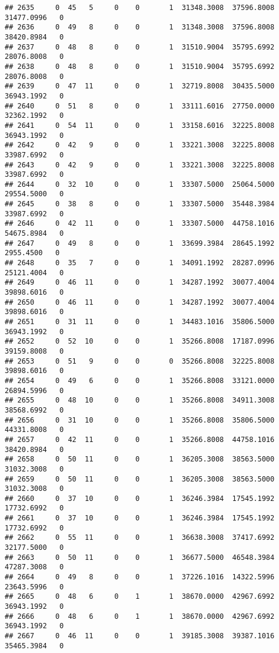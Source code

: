 \documentclass[
]{article}
\begin{document}
\begin{enumerate}
\begin{verbatim}
## 2635     0  45   5     0    0       1  31348.3008  37596.8008  31477.0996   0
## 2636     0  49   8     0    0       1  31348.3008  37596.8008  38420.8984   0
## 2637     0  48   8     0    0       1  31510.9004  35795.6992  28076.8008   0
## 2638     0  48   8     0    0       1  31510.9004  35795.6992  28076.8008   0
## 2639     0  47  11     0    0       1  32719.8008  30435.5000  36943.1992   0
## 2640     0  51   8     0    0       1  33111.6016  27750.0000  32362.1992   0
## 2641     0  54  11     0    0       1  33158.6016  32225.8008  36943.1992   0
## 2642     0  42   9     0    0       1  33221.3008  32225.8008  33987.6992   0
## 2643     0  42   9     0    0       1  33221.3008  32225.8008  33987.6992   0
## 2644     0  32  10     0    0       1  33307.5000  25064.5000  29554.5000   0
## 2645     0  38   8     0    0       1  33307.5000  35448.3984  33987.6992   0
## 2646     0  42  11     0    0       1  33307.5000  44758.1016  54675.8984   0
## 2647     0  49   8     0    0       1  33699.3984  28645.1992   2955.4500   0
## 2648     0  35   7     0    0       1  34091.1992  28287.0996  25121.4004   0
## 2649     0  46  11     0    0       1  34287.1992  30077.4004  39898.6016   0
## 2650     0  46  11     0    0       1  34287.1992  30077.4004  39898.6016   0
## 2651     0  31  11     0    0       1  34483.1016  35806.5000  36943.1992   0
## 2652     0  52  10     0    0       1  35266.8008  17187.0996  39159.8008   0
## 2653     0  51   9     0    0       0  35266.8008  32225.8008  39898.6016   0
## 2654     0  49   6     0    0       1  35266.8008  33121.0000  26894.5996   0
## 2655     0  48  10     0    0       1  35266.8008  34911.3008  38568.6992   0
## 2656     0  31  10     0    0       1  35266.8008  35806.5000  44331.8008   0
## 2657     0  42  11     0    0       1  35266.8008  44758.1016  38420.8984   0
## 2658     0  50  11     0    0       1  36205.3008  38563.5000  31032.3008   0
## 2659     0  50  11     0    0       1  36205.3008  38563.5000  31032.3008   0
## 2660     0  37  10     0    0       1  36246.3984  17545.1992  17732.6992   0
## 2661     0  37  10     0    0       1  36246.3984  17545.1992  17732.6992   0
## 2662     0  55  11     0    0       1  36638.3008  37417.6992  32177.5000   0
## 2663     0  50  11     0    0       1  36677.5000  46548.3984  47287.3008   0
## 2664     0  49   8     0    0       1  37226.1016  14322.5996  23643.5996   0
## 2665     0  48   6     0    1       1  38670.0000  42967.6992  36943.1992   0
## 2666     0  48   6     0    1       1  38670.0000  42967.6992  36943.1992   0
## 2667     0  46  11     0    0       1  39185.3008  39387.1016  35465.3984   0

\end{verbatim}
\end{enumerate}
\end{document}
